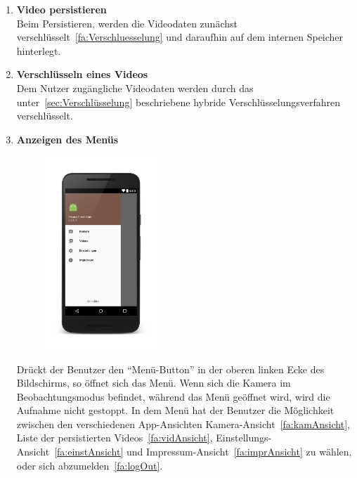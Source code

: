 \begin{enumerate}
\item \label{fa:Persistieren}\textbf{Video \gls{persistieren}} \hfill \\
Beim Persistieren, werden die Videodaten zunächst verschlüsselt~\eqref{fa:Verschluesselung} und daraufhin auf dem internen Speicher hinterlegt.

\item \label{fa:Verschluesselung}\textbf{Verschlüsseln eines Videos} \hfill \\
Dem Nutzer zugängliche Videodaten werden durch das unter~\ref{sec:Verschlüsselung} beschriebene hybride Verschlüsselungsverfahren verschlüsselt.

\item \begin{minipage}[t]{\linewidth} 
\textbf{Anzeigen des Menüs} \hfill \\
	\begin{figure}
		\vspace{-70pt}
  		\begin{center}
   			\includegraphics[width=0.4\textwidth]{subtopicsFuncspec/Res/Mockups/Portrait_camera_view_menu_phone.png}
  		\end{center}
  		\vspace{-20pt}
  		\vspace{-10pt}
	\end{figure}
Drückt der Benutzer den ``Menü-Button'' in der oberen linken Ecke des Bildschirms, so öffnet sich das Menü. Wenn sich die Kamera im Beobachtungsmodus befindet, während das Menü geöffnet wird, wird die Aufnahme nicht gestoppt. In dem Menü hat der Benutzer die Möglichkeit zwischen den verschiedenen \gls{App}-Ansichten Kamera-Ansicht~\eqref{fa:kamAnsicht}, Liste der persistierten Videos~\eqref{fa:vidAnsicht}, Einstellungs-Ansicht~\eqref{fa:einstAnsicht} und Impressum-Ansicht~\eqref{fa:imprAnsicht} zu wählen, oder sich abzumelden~\eqref{fa:logOut}.


\end{minipage}
\end{enumerate}
